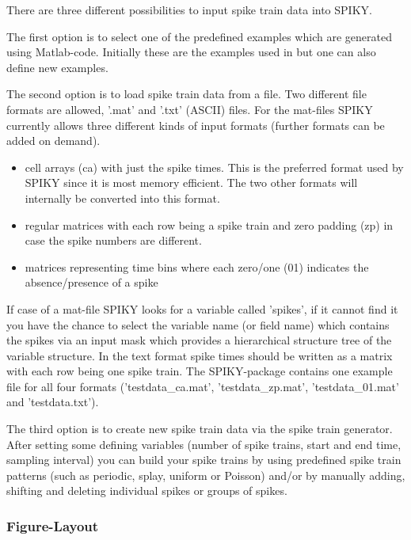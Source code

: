 \documentclass[10pt,twocolumn]{elsart5p}
\begin{document}
There are three different possibilities to input spike train data into SPIKY.

The first option is to select one of the predefined examples which are generated using Matlab-code. Initially these are the examples used in \citep{Kreuz13} but one can also define new examples.

The second option is to load spike train data from a file. Two different file formats are allowed, '.mat' and '.txt' (ASCII) files. For the mat-files SPIKY currently allows three different kinds of input formats (further formats can be added on demand).

\begin{itemize}
\item cell arrays (ca) with just the spike times. This is the preferred format used by SPIKY since it is most memory efficient. The two other formats will internally be converted into this format.
\item regular matrices with each row being a spike train and zero padding (zp) in case the spike numbers are different.
\item matrices representing time bins where each zero/one (01) indicates the absence/presence of a spike
\end{itemize}

If case of a mat-file SPIKY looks for a variable called 'spikes', if it cannot find it you have the chance to select the variable name (or field name) which contains the spikes via an input mask which provides a hierarchical structure tree of the variable structure. In the text format spike times should be written as a matrix with each row being one spike train. The SPIKY-package contains one example file for all four formats ('testdata\_ca.mat', 'testdata\_zp.mat', 'testdata\_01.mat' and 'testdata.txt').

The third option is to create new spike train data via the spike train generator. After setting some defining variables (number of spike trains, start and end time, sampling interval) you can build your spike trains by using predefined spike train patterns (such as periodic, splay, uniform or Poisson) and/or by manually adding, shifting and deleting individual spikes or groups of spikes.


\subsubsection{\label{sss:Figure-Layout} Figure-Layout}
\end{document}
